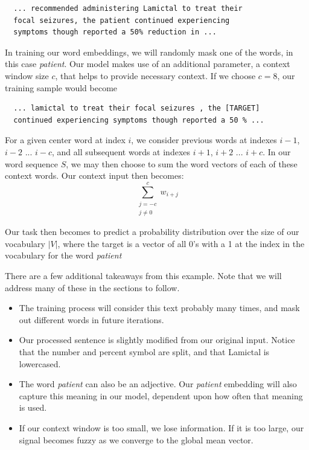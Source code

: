 \begin{verbatim}
  ... recommended administering Lamictal to treat their
  focal seizures, the patient continued experiencing
  symptoms though reported a 50% reduction in ...
  \end{verbatim}

In training our word embeddings, we will randomly mask one of the words, in this case \textit{patient}. Our model makes use of an additional parameter, a context window size $c$, that helps to provide necessary context. If we choose $c = 8$, our training sample would become

\begin{verbatim}
  ... lamictal to treat their focal seizures , the [TARGET]
  continued experiencing symptoms though reported a 50 % ...
  \end{verbatim}

For a given center word at index $i$, we consider previous words at indexes $i-1$, $i-2$ ... $i-c$, and all subsequent words at indexes $i+1$, $i+2$ ... $i+c$.
In our word sequence $S$, we may then choose to sum the word vectors of each of these context words. Our context input then becomes:
\begin{equation}
  \sum_{ \substack {j=-c \\ j \neq 0}}^c w_{i+j}
\end{equation}

Our task then becomes to predict a probability distribution over the size of our vocabulary $|V|$, where the target is a vector of all 0's with a 1 at the index in the vocabulary for the word \textit{patient}

There are a few additional takeaways from this example. Note that we will address many of these in the sections to follow.
\begin{itemize}
  \item The training process will consider this text probably many times, and mask out different words in future iterations.
  \item Our processed sentence is slightly modified from our original input. Notice that the number and percent symbol are split, and that Lamictal is lowercased.
  \item The word \textit{patient} can also be an adjective. Our \textit{patient} embedding will also capture this meaning in our model, dependent upon how often that meaning is used.
  \item If our context window is too small, we lose information. If it is too large, our signal becomes fuzzy as we converge to the global mean vector.
\end{itemize}

